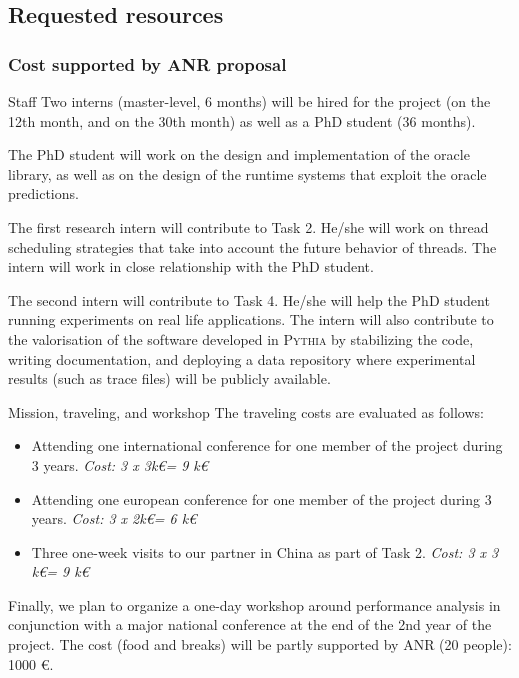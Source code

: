 \documentclass[a4paper,11pt,defblank]{article}
\newcommand{\todo}[1]{\mynote{TODO}{#1}}
\newcommand{\pname}{\textsc{Pythia}\xspace}
\begin{document}
\subsection{Requested resources}
\vspace{1cm}
\subsubsection{Cost supported by ANR proposal}
\begin{paragraph}{Staff}
Two interns (master-level, 6 months) will be hired for the project (on
the 12th month, and on the 30th month) as well as a PhD student (36
months).

The PhD student will work on the design and implementation of the
oracle library, as well as on the design of the runtime systems that
exploit the oracle predictions.

The first research intern will contribute to Task 2. He/she will work
on thread scheduling strategies that take into account the future
behavior of threads. The intern will work in close relationship with
the PhD student.%

The second intern will contribute to Task 4. He/she will help the PhD
student running experiments on real life applications. The intern will
also contribute to the valorisation of the software developed in
\pname by stabilizing the code, writing documentation, and deploying a
data repository where experimental results (such as trace files) will
be publicly available.
\end{paragraph}

\begin{paragraph}{Mission, traveling, and workshop}
  The traveling costs are evaluated as follows:
  \begin{itemize}
  \item Attending one international conference for one member of the
    project during 3 years. \emph{Cost: 3 x 3k\euro = 9 k\euro}
  \item Attending one european conference for one member of the
    project during 3 years. \emph{Cost: 3 x 2k\euro = 6 k\euro}
  \item Three one-week visits to our partner in China as part of Task
    2. \emph{Cost: 3 x 3 k\euro = 9 k\euro}
  \end{itemize}

  Finally, we plan to organize a one-day workshop around performance
  analysis in conjunction with a major national conference at the end
  of the 2nd year of the project. The cost (food and breaks) will be
  partly supported by ANR (20 people): 1000 \euro.
\end{paragraph}
\end{document}
